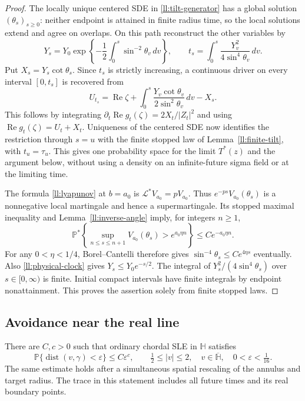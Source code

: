 \begin{proof}
The locally unique centered SDE in \eqref{ll:tilt-generator} has a global
solution $(\theta_s)_{s\ge0}$: neither endpoint is attained in finite
radius time, so the local solutions extend and agree on overlaps.
On this path reconstruct the other variables by
\[
 Y_s=Y_0\exp\left\{-\frac12\int_0^s\sin^{-2}\theta_v\,dv\right\},
 \qquad
 t_s=\int_0^s\frac{Y_v^2}{4\sin^4\theta_v}\,dv.
\]
Put $X_s=Y_s\cot\theta_s$.  Since $t_s$ is strictly increasing, a
continuous driver on every interval $[0,t_s]$ is recovered from
\[
 U_{t_s}=\operatorname{Re}\zeta+
       \int_0^s\frac{Y_v\cot\theta_v}{2\sin^2\theta_v}\,dv-X_s.
\]
This follows by integrating $\partial_t\operatorname{Re}g_t(\zeta)
=2X_t/|Z_t|^2$ and using $\operatorname{Re}g_t(\zeta)=U_t+X_t$.
Uniqueness of the centered SDE now identifies the restriction through
$s=u$ with the finite stopped law of Lemma~\ref{ll:finite-tilt}, with
$t_u=\tau_u$. This gives one probability space for the limit $T^*(z)$
and the argument below, without using a
density on an infinite-future sigma field or at the limiting time.

The formula \eqref{ll:lyapunov} at $b=a_0$ is
$\mathcal L^*V_{a_0}=pV_{a_0}$.
Thus $e^{-ps}V_{a_0}(\theta_s)$ is a nonnegative local martingale
and hence a supermartingale. Its stopped maximal inequality and
Lemma~\ref{ll:inverse-angle} imply, for integers $n\ge1$,
\[
 \mathbb P^*\left\{\sup_{n\le s\le n+1}
       V_{a_0}(\theta_s)>e^{a_0\eta n}\right\}
       \le C e^{-a_0\eta n}.
\]
For any $0<\eta<1/4$, Borel--Cantelli therefore gives
$\sin^{-4}\theta_s\le C e^{4\eta s}$ eventually.
Also \eqref{ll:physical-clock} gives $Y_s\le Y_0e^{-s/2}$.
The integral of $Y_s^2/(4\sin^4\theta_s)$ over $s\in[0,\infty)$
is finite. Initial compact intervals have finite integrals by
endpoint nonattainment. This proves the assertion solely from
finite stopped laws.
\end{proof}

\subsection{Avoidance near the real line}

\begin{lemma}\label{ll:near-real}
There are $C,c>0$ such that ordinary chordal SLE in $\mathbb H$
satisfies
\[
 \mathbb P\{\operatorname{dist}(v,\gamma)<\varepsilon\}
       \le C\varepsilon^c,
 \qquad \tfrac12\le|v|\le2,\quad
 v\in\overline{\mathbb H},\quad 0<\varepsilon<\tfrac1{16}.
\]
The same estimate holds after a simultaneous spatial rescaling of
the annulus and target radius. The trace in this statement includes
all future times and its real boundary points.
\end{lemma}


